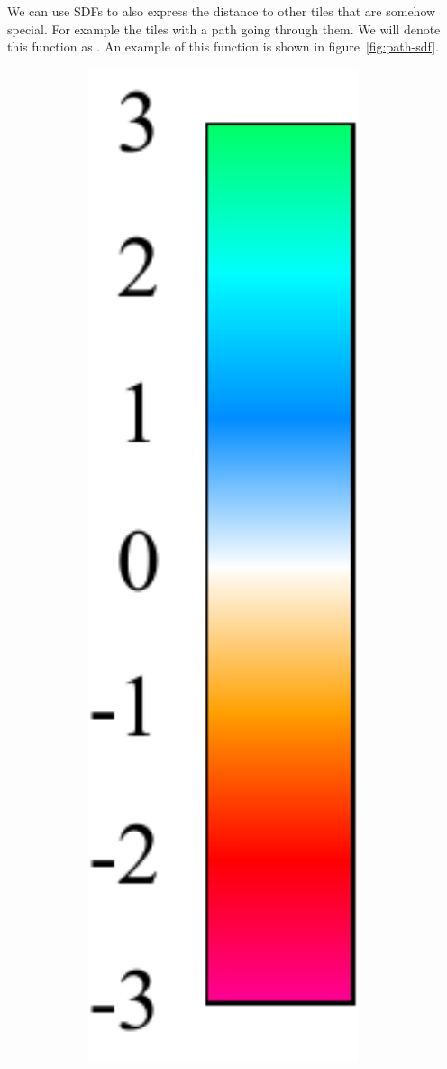 We can use SDFs to also express the distance to other tiles that are somehow special.
For example the tiles with a path going through them.
We will denote this function as .
An example of this function is shown in figure~\ref{fig:path-sdf}.

\begin{center}
    \captionsetup{type=figure}
    \begin{minipage}{.07\textwidth}
        \centering
        \includegraphics[width=0.95\textwidth]{img/noise expr gradient.pdf}

\end{minipage}
\end{center}
